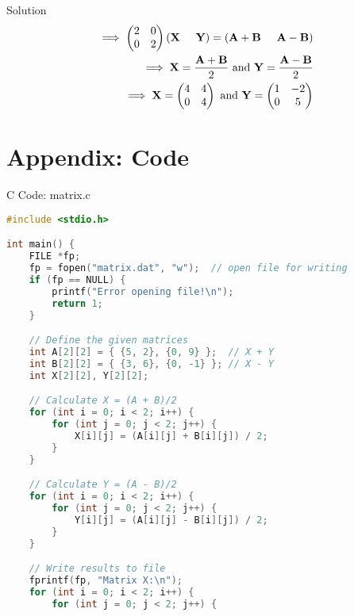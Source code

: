 \documentclass{beamer}
\numberwithin{equation}{section}
\providecommand{\brak}[1]{\ensuremath{\left(#1\right)}}
\theoremstyle{remark}
\let\vec\mathbf
\begin{document}
    \begin{frame}{Solution}
        \begin{align}
        \implies \begin{pmatrix}
        2 & 0\\
         0 & 2
    \end{pmatrix} \brak{\vec{X}\hspace{0.5cm}\vec{Y}}= \brak{\vec{A+B}\hspace{0.5cm}\vec{A-B}}\\
    \implies \vec{X}=\frac{\vec{A+B}}{2} \text{ and } \vec{Y}=\frac{\vec{A-B}}{2}\\ \implies \vec{X}=\begin{pmatrix}
        4 & 4\\
         0 & 4
    \end{pmatrix} \text{ and } \vec{Y}=\begin{pmatrix}
        1 & -2\\
         0 & 5
    \end{pmatrix}
    \end{align}
\end{frame}

\section*{Appendix: Code}

\begin{frame}[fragile]{C Code: matrix.c}
\begin{lstlisting}[language=C]
#include <stdio.h>

int main() {
    FILE *fp;
    fp = fopen("matrix.dat", "w");  // open file for writing
    if (fp == NULL) {
        printf("Error opening file!\n");
        return 1;
    }

    // Define the given matrices
    int A[2][2] = { {5, 2}, {0, 9} };  // X + Y
    int B[2][2] = { {3, 6}, {0, -1} }; // X - Y
    int X[2][2], Y[2][2];

    // Calculate X = (A + B)/2
    for (int i = 0; i < 2; i++) {
        for (int j = 0; j < 2; j++) {
            X[i][j] = (A[i][j] + B[i][j]) / 2;
        }
    }

    // Calculate Y = (A - B)/2
    for (int i = 0; i < 2; i++) {
        for (int j = 0; j < 2; j++) {
            Y[i][j] = (A[i][j] - B[i][j]) / 2;
        }
    }

    // Write results to file
    fprintf(fp, "Matrix X:\n");
    for (int i = 0; i < 2; i++) {
        for (int j = 0; j < 2; j++) {
           
\end{lstlisting}
\end{frame}
\end{document}
